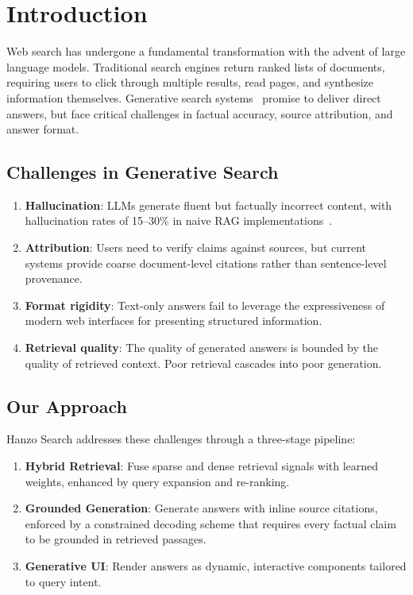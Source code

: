 \section{Introduction}

\label{sec:intro}

Web search has undergone a fundamental transformation with the advent of large language models. Traditional search engines return ranked lists of documents, requiring users to click through multiple results, read pages, and synthesize information themselves. Generative search systems~\cite{metzler2021rethinking,nair2023bing} promise to deliver direct answers, but face critical challenges in factual accuracy, source attribution, and answer format.

\subsection{Challenges in Generative Search}

\begin{enumerate}[leftmargin=1.4em]
    \item \textbf{Hallucination}: LLMs generate fluent but factually incorrect content, with hallucination rates of 15--30\% in naive RAG implementations~\cite{huang2023hallucination}.
    \item \textbf{Attribution}: Users need to verify claims against sources, but current systems provide coarse document-level citations rather than sentence-level provenance.
    \item \textbf{Format rigidity}: Text-only answers fail to leverage the expressiveness of modern web interfaces for presenting structured information.
    \item \textbf{Retrieval quality}: The quality of generated answers is bounded by the quality of retrieved context. Poor retrieval cascades into poor generation.
\end{enumerate}

\subsection{Our Approach}

Hanzo Search addresses these challenges through a three-stage pipeline:

\begin{enumerate}[leftmargin=1.4em]
    \item \textbf{Hybrid Retrieval}: Fuse sparse and dense retrieval signals with learned weights, enhanced by query expansion and re-ranking.
    \item \textbf{Grounded Generation}: Generate answers with inline source citations, enforced by a constrained decoding scheme that requires every factual claim to be grounded in retrieved passages.
    \item \textbf{Generative UI}: Render answers as dynamic, interactive components tailored to query intent.
\end{enumerate}

